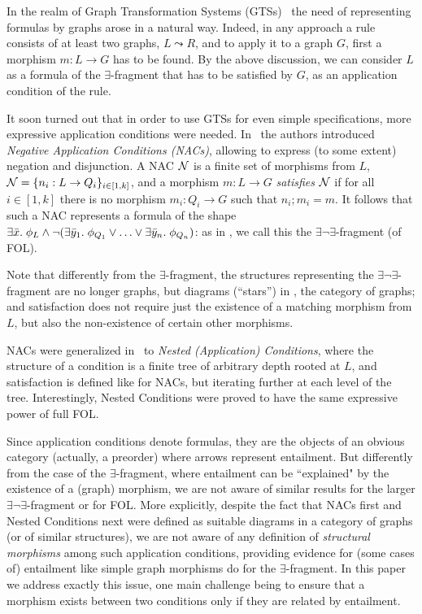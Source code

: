 In the realm of Graph Transformation Systems  (GTSs)~\cite{eept:fundamentals-agt,DBLP:books/sp/HeckelT20}
 the need of representing formulas by graphs arose in a natural way. Indeed,
in any approach a rule consists of at least two graphs, $L \leadsto R$, and to apply it to a graph $G$, first a morphism $m: L \to G$ has to be found. 
 By the above discussion, we can consider $L$ as a formula of the $\exists$-fragment that has to be satisfied by $G$, as an application condition of the rule. 

It soon turned out that in order to use GTSs for even simple specifications, more expressive application conditions were needed. 
In~\cite{NegativeAC} the authors introduced \emph{Negative Application Conditions (NACs)}, allowing to express (to some extent) negation and disjunction.  A NAC $\mathcal{N}$ is  a finite set of morphisms from $L$, $\mathcal{N} = \{n_i: L \rightarrow Q_i\}_{i\in[1,k]}$, and a morphism $m: L \to G$ \emph{satisfies} $\mathcal{N}$ if for all $i\in[1,k]$ there is no morphism $m_i: Q_i \to G$ such that $n_i;m_i = m$. 
It follows that such a NAC represents a formula of the shape $\exists \bar{x}.\; \phi_L \wedge \neg (\exists \bar{y}_1.\; \phi_{Q_1} \vee \ldots \vee \exists \bar{y}_n.\; \phi_{Q_n})$: as in \cite{Rensink-FOL}, we call this the $\exists \neg \exists$-fragment (of FOL).

Note that differently from the $\exists$-fragment, the structures representing the $\exists \neg \exists$-fragment are no longer graphs, but diagrams (``stars'') in , the category of graphs; and satisfaction does not require just the existence of a matching morphism from $L$, but also the non-existence of certain other morphisms.

NACs were generalized in~\cite{Rensink-FOL,Habel-FOL} to \emph{Nested (Application) Conditions}, where the structure of a condition is a finite tree of arbitrary depth rooted at $L$, and satisfaction is defined like for NACs, but iterating further at each level of the tree. Interestingly, Nested Conditions were proved to have the same expressive power of full FOL.

Since application conditions denote formulas, they are the objects of an obvious category (actually, a preorder) where arrows represent entailment. But differently from the case of the $\exists$-fragment, where entailment can be ``explained" by the existence of a (graph) morphism, we are not aware of similar results for the larger $\exists \neg\exists$-fragment or for FOL. More explicitly, despite the fact that NACs first and Nested Conditions next were defined as suitable diagrams in a category of graphs (or of similar structures), we are not aware of any definition of \emph{structural morphisms} among such application conditions, providing evidence for (some cases of) entailment like simple graph morphisms do for the $\exists$-fragment. In this paper we address exactly this issue, one main challenge being to ensure that a morphism exists between two conditions only if they are related by entailment.

